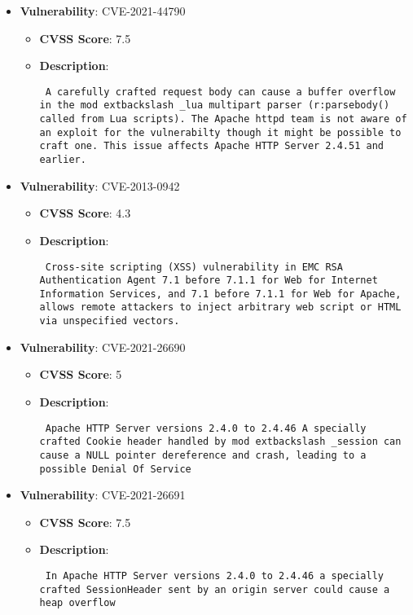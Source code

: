 \documentclass{article}
\begin{document}
\begin{itemize}
        \item \textbf{Vulnerability}: CVE-2021-44790
        \begin{itemize}
            \item \textbf{CVSS Score}:  7.5 
            \item \textbf{Description}: \parbox{\linewidth}{\texttt{ A carefully crafted request body can cause a buffer overflow in the mod	extbackslash _lua multipart parser (r:parsebody() called from Lua scripts). The Apache httpd team is not aware of an exploit for the vulnerabilty though it might be possible to craft one. This issue affects Apache HTTP Server 2.4.51 and earlier. }}
        \end{itemize}
    
        \item \textbf{Vulnerability}: CVE-2013-0942
        \begin{itemize}
            \item \textbf{CVSS Score}:  4.3 
            \item \textbf{Description}: \parbox{\linewidth}{\texttt{ Cross-site scripting (XSS) vulnerability in EMC RSA Authentication Agent 7.1 before 7.1.1 for Web for Internet Information Services, and 7.1 before 7.1.1 for Web for Apache, allows remote attackers to inject arbitrary web script or HTML via unspecified vectors. }}
        \end{itemize}
    
        \item \textbf{Vulnerability}: CVE-2021-26690
        \begin{itemize}
            \item \textbf{CVSS Score}:  5 
            \item \textbf{Description}: \parbox{\linewidth}{\texttt{ Apache HTTP Server versions 2.4.0 to 2.4.46 A specially crafted Cookie header handled by mod	extbackslash _session can cause a NULL pointer dereference and crash, leading to a possible Denial Of Service }}
        \end{itemize}
    
        \item \textbf{Vulnerability}: CVE-2021-26691
        \begin{itemize}
            \item \textbf{CVSS Score}:  7.5 
            \item \textbf{Description}: \parbox{\linewidth}{\texttt{ In Apache HTTP Server versions 2.4.0 to 2.4.46 a specially crafted SessionHeader sent by an origin server could cause a heap overflow }}
        \end{itemize}
    

\end{itemize}
\end{document}
